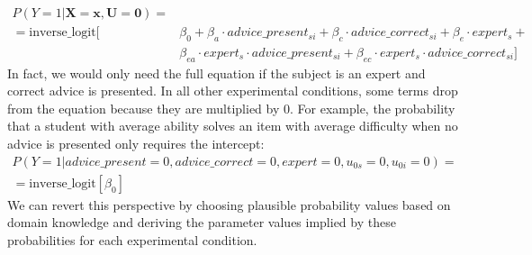 \documentclass[
  man,
  floatsintext,
  longtable,
  a4paper,
  nolmodern,
  notxfonts,
  notimes,
  colorlinks=true,linkcolor=blue,citecolor=blue,urlcolor=blue]{apa7}
\begin{document}
\[
\begin{aligned}
P(Y=1|\mathbf{X=x}, \mathbf{U} = \mathbf{0}) = \\
= \text{inverse\_logit}[&\beta_0 + \beta_a \cdot advice\_present_{si} + \beta_c \cdot advice\_correct_{si} + \beta_e \cdot expert_s + \\
&\beta_{ea} \cdot expert_{s} \cdot advice\_present_{si} + \beta_{ec} \cdot expert_{s} \cdot advice\_correct_{si}]
\end{aligned}
\] In fact, we would only need the full equation if the subject is an
expert and correct advice is presented. In all other experimental
conditions, some terms drop from the equation because they are
multiplied by \(0\). For example, the probability that a student with
average ability solves an item with average difficulty when no advice is
presented only requires the intercept: \[
\begin{aligned}
P(Y=1| advice\_present = 0, advice\_correct = 0, expert = 0, u_{0s} = 0, u_{0i} = 0) = \\
= \text{inverse\_logit}[\beta_0]
\end{aligned}
\] We can revert this perspective by choosing plausible probability
values based on domain knowledge and deriving the parameter values
implied by these probabilities for each experimental condition.
\end{document}
